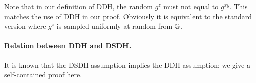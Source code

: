 Note that in our definition of DDH, the random $g^z$ must not equal to $g^{xy}$. This matches the use of DDH in our proof. Obviously it is equivalent to the standard version where $g^z$ is sampled uniformly at random from $\mathbb{G}$.

\paragraph{Relation between DDH and DSDH.}
It is known that the DSDH assumption implies the DDH assumption; we give a self-contained proof here.







